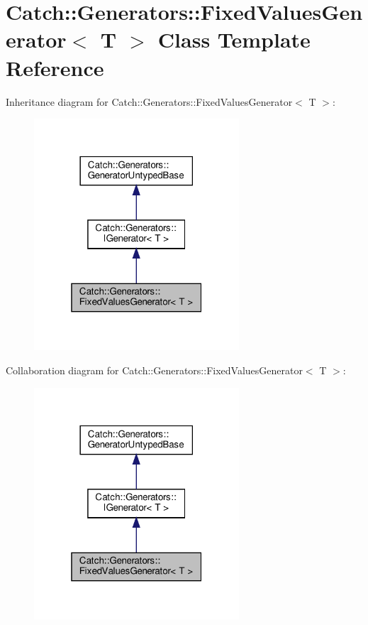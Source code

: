\hypertarget{classCatch_1_1Generators_1_1FixedValuesGenerator}{}\section{Catch\+:\+:Generators\+:\+:Fixed\+Values\+Generator$<$ T $>$ Class Template Reference}
\label{classCatch_1_1Generators_1_1FixedValuesGenerator}


Inheritance diagram for Catch\+:\+:Generators\+:\+:Fixed\+Values\+Generator$<$ T $>$\+:
\nopagebreak
\begin{figure}[H]
\begin{center}
\leavevmode
\includegraphics[width=217pt]{classCatch_1_1Generators_1_1FixedValuesGenerator__inherit__graph}
\end{center}
\end{figure}


Collaboration diagram for Catch\+:\+:Generators\+:\+:Fixed\+Values\+Generator$<$ T $>$\+:
\nopagebreak
\begin{figure}[H]
\begin{center}
\leavevmode
\includegraphics[width=217pt]{classCatch_1_1Generators_1_1FixedValuesGenerator__coll__graph}
\end{center}
\end{figure}
